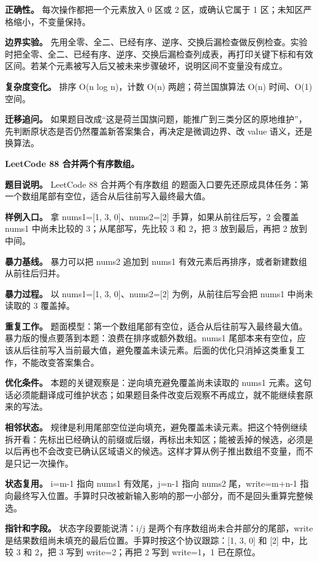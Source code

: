 \textbf{正确性。} 每次操作都把一个元素放入 0 区或 2 区，或确认它属于 1 区；未知区严格缩小，不变量保持。

\textbf{边界实验。} 先用全零、全二、已经有序、逆序、交换后漏检查做反例检查。实验时把全零、全二、已经有序、逆序、交换后漏检查列成表，再打印关键下标和有效区间。若某个元素被写入后又被未来步骤破坏，说明区间不变量没有成立。

\textbf{复杂度变化。} 排序 O(n log n)，计数 O(n) 两趟；荷兰国旗算法 O(n) 时间、O(1) 空间。

\textbf{迁移追问。} 如果题目改成“这是荷兰国旗问题，能推广到三类分区的原地维护”，先判断原状态是否仍然覆盖新答案集合，再决定是微调边界、改 value 语义，还是换算法。

\noindent\textbf{LeetCode 88 合并两个有序数组。}

\textbf{题目说明。} LeetCode 88 合并两个有序数组 的题面入口要先还原成具体任务：第一个数组尾部有空位，适合从后往前写入最终最大值。

\textbf{样例入口。} 拿 nums1=[1, 3, 0]、nums2=[2] 手算，如果从前往后写，2 会覆盖 nums1 中尚未比较的 3；从尾部写，先比较 3 和 2，把 3 放到最后，再把 2 放到中间。

\textbf{暴力基线。} 暴力可以把 nums2 追加到 nums1 有效元素后再排序，或者新建数组从前往后归并。

\textbf{暴力过程。} 以 nums1=[1, 3, 0]、nums2=[2] 为例，从前往后写会把 nums1 中尚未读取的 3 覆盖掉。

\textbf{重复工作。} 题面模型：第一个数组尾部有空位，适合从后往前写入最终最大值。暴力版的慢点要落到本题：浪费在排序或额外数组。nums1 尾部本来有空位，应该从后往前写入当前最大值，避免覆盖未读元素。后面的优化只消掉这类重复工作，不能改变答案集合。

\textbf{优化条件。} 本题的关键观察是：逆向填充避免覆盖尚未读取的 nums1 元素。这句话必须能翻译成可维护状态；如果题目条件改变后观察不再成立，就不能继续套原来的写法。

\textbf{相邻状态。} 规律是利用尾部空位逆向填充，避免覆盖未读元素。把这个特例继续拆开看：先标出已经确认的前缀或后缀，再标出未知区；能被丢掉的候选，必须是以后再也不会改变已确认区域语义的候选。这样才算从例子推出数组不变量，而不是只记一次操作。

\textbf{状态复用。} i=m-1 指向 nums1 有效尾，j=n-1 指向 nums2 尾，write=m+n-1 指向最终写入位置。手算时只改被新输入影响的那一小部分，而不是回头重算完整候选。

\textbf{指针和字段。} 状态字段要能说清：i/j 是两个有序数组尚未合并部分的尾部，write 是结果数组尚未填充的最后位置。手算时按这个协议跟踪：[1, 3, 0] 和 [2] 中，比较 3 和 2，把 3 写到 write=2；再把 2 写到 write=1，1 已在原位。

